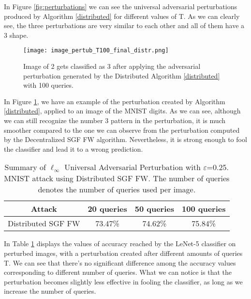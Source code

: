 In Figure \ref{fig:perturbations} we can see the universal adversarial perturbations produced by Algorithm \ref{distributed}
for different values of T. As we can clearly see, the three perturbations are very similar to each other and all of
them have a 3 shape.

\begin{figure}[htbp]
	\centering
	\texttt{[image: image\_pertub\_T100\_final\_distr.png]}
	\caption{Image of 2 gets classified as 3 after applying the adversarial perturbation generated by the Distributed
	Algorithm \ref{distributed} with 100 queries.}
	\label{fig:distributed}
\end{figure}

In Figure \ref{fig:distributed}, we have an example of the perturbation created by Algorithm \ref{distributed},
applied to an image of the MNIST digits. As we can see, although we can still recognize the number 3 pattern in the
perturbation, it is much smoother compared to the one we can observe from the perturbation computed by the Decentralized
SGF FW algorithm. Nevertheless, it is strong enough to fool the classifier and lead it to a wrong prediction.

\begin{table}[htbp]
	\begin{center}
		\begin{adjustwidth}{-.6cm}{}
			\begin{tabular}{c|ccc}
				\textbf{Attack} &          20 \textbf{queries} &      50 \textbf{queries} &     100 \textbf{queries} \\
				\midrule
				{\small Distributed SGF FW}     &   73.47\% &    74.62\% &       75.84\% \\
			\end{tabular}
		\end{adjustwidth}
	\end{center}
	\caption{{\small Summary of $\ell_\infty$ Universal Adversarial Perturbation with $\varepsilon$=0.25. MNIST attack using Distributed
	SGF FW. The number of queries denotes the number of queries used per image.}}
	\label{tab:distributed}
\end{table}

In Table \ref{tab:distributed} displays the values of accuracy reached by the LeNet-5 classifier on perturbed
images, with a perturbation created after different amounts of queries T. We can see that there's no significant
difference among the accuracy values corresponding to different number of queries. What we can notice is that the
perturbation becomes slightly less effective in fooling the classifier, as long as we increase the number of queries.